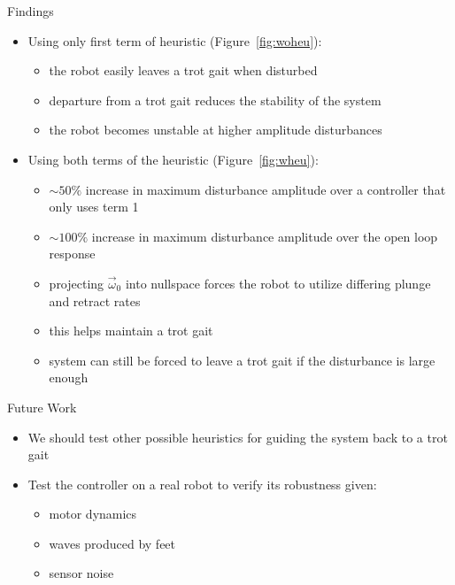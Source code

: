 \textcolor{prime}{\textsf{Findings}} \\
\begin{itemize}
\item Using only first term of heuristic (Figure~\ref{fig:woheu}):
    \begin{itemize}
    \item the robot easily leaves a trot gait when disturbed
    \item departure from a trot gait reduces the stability of the system 
    \item the robot becomes unstable at higher amplitude disturbances
    \end{itemize}

\item Using both terms of the heuristic (Figure~\ref{fig:wheu}):
    \begin{itemize}
    \item $\mathrm{\sim50 \%}$ increase in maximum disturbance amplitude over a controller that only uses term 1
    \item $\mathrm{\sim100 \%}$ increase in maximum disturbance amplitude over the open loop response
    \item projecting $\vec{\omega}_0$ into nullspace forces the robot to utilize differing plunge and retract rates
    \item this helps maintain a trot gait
    \item system can still be forced to leave a trot gait if the disturbance is large enough
    \end{itemize}
\end{itemize}

\vspace{2EX}
\textcolor{prime}{\textsf{Future Work}} \\
\begin{itemize}
    \item We should test other possible heuristics for guiding the system back to a trot gait
	\item Test the controller on a real robot to verify its robustness given:
	\begin{itemize}
		\item motor dynamics
		\item waves produced by feet
		\item sensor noise
	\end{itemize}
\end{itemize}

